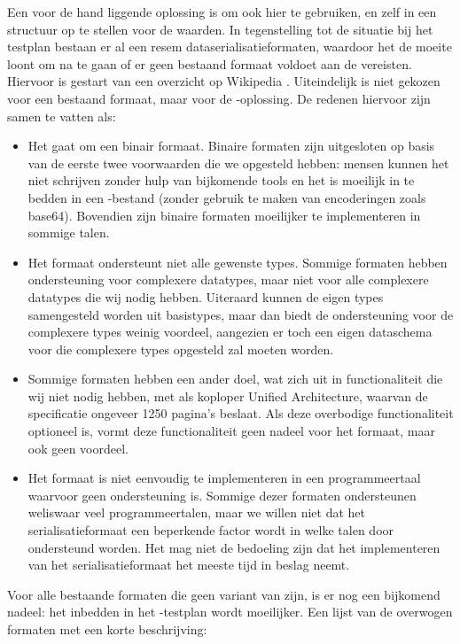 Een voor de hand liggende oplossing is om ook hier  te gebruiken, en zelf in  een structuur op te stellen voor de waarden.
In tegenstelling tot de situatie bij het testplan bestaan er al een resem dataserialisatieformaten, waardoor het de moeite loont om na te gaan of er geen bestaand formaat voldoet aan de vereisten.
Hiervoor is gestart van een overzicht op Wikipedia \autocite{wiki2020}.
Uiteindelijk is niet gekozen voor een bestaand formaat, maar voor de -oplossing.
De redenen hiervoor zijn samen te vatten als:

\begin{itemize}
    \item Het gaat om een binair formaat.
    Binaire formaten zijn uitgesloten op basis van de eerste twee voorwaarden die we opgesteld hebben: mensen kunnen het niet schrijven zonder hulp van bijkomende tools en het is moeilijk in te bedden in een -bestand (zonder gebruik te maken van encoderingen zoals base64).
    Bovendien zijn binaire formaten moeilijker te implementeren in sommige talen.
    \item Het formaat ondersteunt niet alle gewenste types.
    Sommige formaten hebben ondersteuning voor complexere datatypes, maar niet voor alle complexere datatypes die wij nodig hebben.
    Uiteraard kunnen de eigen types samengesteld worden uit basistypes, maar dan biedt de ondersteuning voor de complexere types weinig voordeel, aangezien er toch een eigen dataschema voor die complexere types opgesteld zal moeten worden.
    \item Sommige formaten hebben een ander doel, wat zich uit in functionaliteit die wij niet nodig hebben, met als koploper  Unified Architecture, waarvan de specificatie ongeveer 1250 pagina's beslaat.
    Als deze overbodige functionaliteit optioneel is, vormt deze functionaliteit geen nadeel voor het formaat, maar ook geen voordeel.
    \item Het formaat is niet eenvoudig te implementeren in een programmeertaal waarvoor geen ondersteuning is.
    Sommige dezer formaten ondersteunen weliswaar veel programmeertalen, maar we willen niet dat het serialisatieformaat een beperkende factor wordt in welke talen door \tested{} ondersteund worden.
    Het mag niet de bedoeling zijn dat het implementeren van het serialisatieformaat het meeste tijd in beslag neemt.
\end{itemize}

Voor alle bestaande formaten die geen variant van  zijn, is er nog een bijkomend nadeel: het inbedden in het -testplan wordt moeilijker.
Een lijst van de overwogen formaten met een korte beschrijving:

